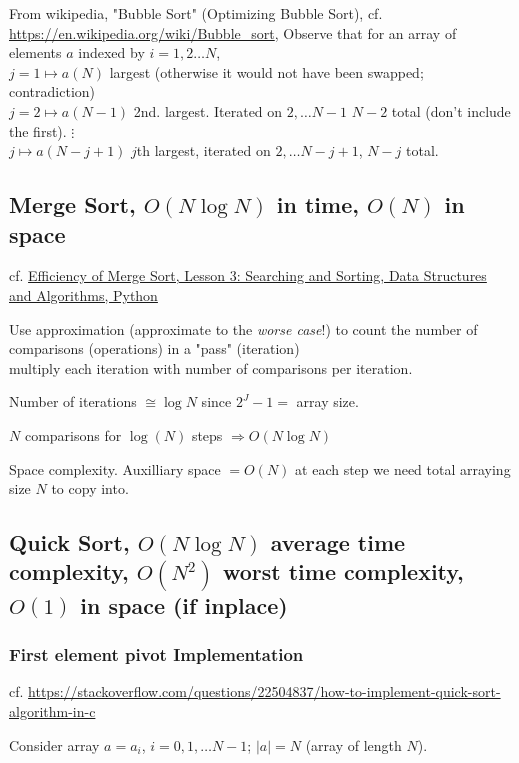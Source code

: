 \documentclass[10pt]{amsart}
\begin{document}
\begin{multicols*}{2}
From wikipedia, "Bubble Sort" (Optimizing Bubble Sort), cf. \url{https://en.wikipedia.org/wiki/Bubble_sort}, Observe that for an array of elements $a$ indexed by $i = 1, 2 \dots N$,  \\
$j = 1 \mapsto a(N) $ largest (otherwise it would not have been swapped; contradiction) \\
$j = 2 \mapsto a(N-1)$ 2nd. largest. Iterated on $ 2, \dots N-1$ $N-2$ total (don't include the first).
$ \vdots$ \\
$ j \mapsto a(N-j +1)$ $j$th largest, iterated on $2, \dots N- j +1$, $N-j$ total.

\subsection{Merge Sort, $O(N \log{N})$ in time, $O(N)$ in space}

cf. \href{https://classroom.udacity.com/courses/ud513/lessons/7123524086/concepts/71254347930923}{Efficiency of Merge Sort, Lesson 3: Searching and Sorting, Data Structures and Algorithms, Python}

Use approximation (approximate to the \emph{worse case}!) to count the number of comparisons (operations) in a "pass" (iteration) \\
multiply each iteration with number of comparisons per iteration.

Number of iterations $\cong \log{N}$ since $2^J - 1 = $ array size. 

$N$ comparisons for $\log{(N)}$ steps $\Longrightarrow O(N \log{N})$

Space complexity. Auxilliary space $=O(N)$ at each step we need total arraying size $N$ to copy into.

\subsection{Quick Sort, $O(N \log{N})$ average time complexity, $O(N^2)$ worst time complexity, $O(1)$ in space (if inplace)}

\subsubsection{First element pivot Implementation}

cf. \url{https://stackoverflow.com/questions/22504837/how-to-implement-quick-sort-algorithm-in-c}

Consider array $a=a_i$, $i=0,1, \dots N-1$; $|a|=N$ (array of length $N$).


\end{multicols*}
\end{document}
